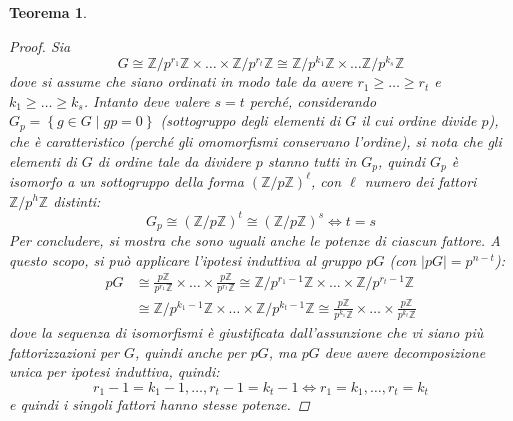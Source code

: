 \documentclass[12pt]{scrartcl}
\theoremstyle{style}
\newtheorem{teorema}{Teorema}[section]
\numberwithin{equation}{subsection}
\begin{document}
\begin{teorema}
\begin{proof}
Sia 
\[
G \cong \mathbb{Z}/ p^{r_1} \mathbb{Z} \times \ldots \times \mathbb{Z}/ p^{r_t} \mathbb{Z} \cong \mathbb{Z}/ p^{k_1} \mathbb{Z}\times \ldots\mathbb{Z}/p^{k_s} \mathbb{Z}
\] 
dove si assume che siano ordinati in modo tale da avere $r_1\ge \ldots\ge r_t $ e $k_1\ge \ldots\ge k_s$.
Intanto deve valere $s=t$ perch\'e, considerando $G_p = \left\{ g \in G  \mid gp = 0 \right\} $ (sottogruppo degli elementi di $G$ il cui ordine divide $p$), che \`e caratteristico (perch\'e gli omomorfismi conservano l'ordine), si nota che gli elementi di $G$ di ordine tale da dividere $p$ stanno tutti in $G_p$, quindi $G_p$ \`e isomorfo a un sottogruppo della forma $(\mathbb{Z} / p\mathbb{Z})^\ell $, con $\ell $ numero dei fattori $\mathbb{Z} / p^h \mathbb{Z}$ distinti:
\[
G_p \cong (\mathbb{Z}/p\mathbb{Z})^t \cong (\mathbb{Z}/p\mathbb{Z})^s \iff t= s
\] 
Per concludere, si mostra che sono uguali anche le potenze di ciascun fattore.
A questo scopo, si pu\`o applicare l'ipotesi induttiva al gruppo $pG$ (con $\lvert pG \rvert =p^{n-t} $):
\[
	\begin{split}
		pG &\cong \frac{p\mathbb{Z}}{p^{r_1} \mathbb{Z}} \times \ldots\times \frac{p\mathbb{Z}}{p^{r_t} \mathbb{Z}}\cong \mathbb{Z}/p^{r_1-1} \mathbb{Z} \times  \ldots \times \mathbb{Z}/p^{r_t - 1} \mathbb{Z}\\
		   &\cong \mathbb{Z}/p^{k_1-1} \mathbb{Z}\times \ldots\times \mathbb{Z}/p^{k_t-1} \mathbb{Z}\cong \frac{p\mathbb{Z}}{p^{k_1} \mathbb{Z}}\times \ldots \times \frac{p\mathbb{Z}}{p^{k_t} \mathbb{Z}}
	\end{split}
\] 
dove la sequenza di isomorfismi \`e giustificata dall'assunzione che vi siano pi\`u fattorizzazioni per $G$, quindi anche per $pG$, ma $pG$ deve avere decomposizione unica per ipotesi induttiva, quindi:
\[
r_1-1=k_1-1, \ldots, r_t - 1 = k_t - 1 \iff r_1=k_1,\ldots,r_t = k_t
\] 
e quindi i singoli fattori hanno stesse potenze.
	\end{proof}
\end{teorema}
\end{document}
